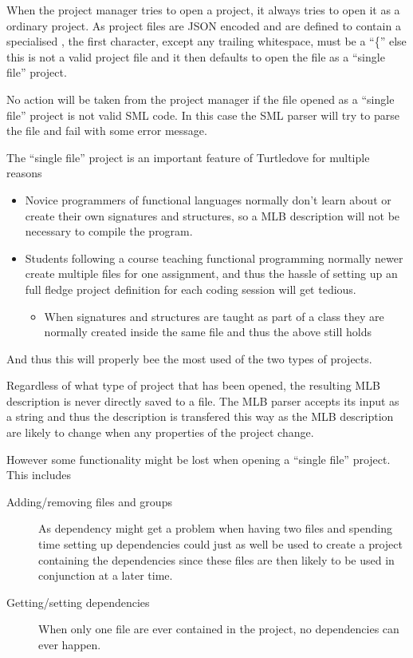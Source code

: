 When the project manager tries to open a project, it always tries to open it as
a ordinary project. As project files are JSON encoded and are defined to contain
a specialised , the first character, except any trailing
whitespace, must be a ``\{'' else this is not a valid project file and it then
defaults to open the file as a ``single file'' project.

No action will be taken from the project manager if the file opened as a
``single file'' project is not valid SML code. In this case the SML parser will
try to parse the file and fail with some error message.

The ``single file'' project is an important feature of Turtledove for multiple
reasons

\begin{itemize}
\item Novice programmers of functional languages normally don't learn about or
  create their own signatures and structures, so a MLB description will not be
  necessary to compile the program.

\item Students following a course teaching functional programming normally newer
  create multiple files for one assignment, and thus the hassle of setting up an
  full fledge project definition for each coding session will get tedious.

  \begin{itemize}
  \item When signatures and structures are taught as part of a class they are
    normally created inside the same file and thus the above still holds 
  \end{itemize}
\end{itemize}
 
And thus this will properly bee the most used of the two types of projects.

Regardless of what type of project that has been opened, the resulting MLB
description is never directly saved to a file. The MLB parser accepts its input
as a string and thus the description is transfered this way as the MLB
description are likely to change when any properties of the project change.

However some functionality might be lost when opening a ``single file''
project. This includes

\begin{description}
\item[Adding/removing files and groups] As dependency might get
a problem when having two files and spending time setting up dependencies
could just as well be used to create a project containing the dependencies since
these files are then likely to be used in conjunction at a later time.


\item[Getting/setting dependencies] When only one file are ever contained in the
  project, no dependencies can ever happen.
\end{description}


